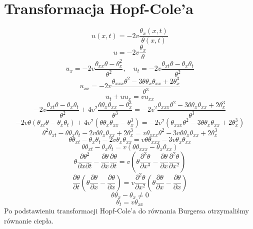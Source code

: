 \documentclass[a4paper,12pt]{article}
\begin{document}
\section{Transformacja Hopf-Cole'a}
$$u(x,t)=-2v\frac{\theta _x (x,t)}{\theta (x,t)}$$
$$u=-2v\frac{\theta _x}{\theta}$$
	$$u_x=-2v\frac{\theta _{xx} \theta - \theta ^{2}_{x}}{\theta ^2}, \quad u_t=-2v\frac{\theta _{xt}\theta - \theta _x \theta _t}{\theta ^2}$$
	$$u_{xx}=-2v\frac{\theta _{xxx}\theta ^2 - 3\theta \theta _x \theta _{xx} + 2\theta ^{3}_{x}}{\theta ^3}$$
	$$u_t + u u_x = v u_{xx}$$
$$-2v \frac{\theta _{xt}\theta - \theta _x \theta _t }{\theta ^2} + 4 v^2 \frac{\theta \theta _x \theta _{xx} - \theta ^{3}_{x}}{\theta ^3} = -2v^2\frac{\theta _{xxx} \theta ^2 - 3\theta \theta _x \theta _{xx} + 2\theta ^{3}_{x}}{\theta ^3}$$
$$-2v\theta (\theta _{xt} \theta - \theta _x \theta _t ) +4v^2 (\theta \theta _x \theta _{xx} - \theta ^{3}_{x}) = -2v^2(\theta _{xxx} \theta ^2 - 3\theta \theta _x \theta _{xx} + 2\theta ^{3}_{x})$$
$$\theta ^2 \theta _{xt} - \theta \theta _x \theta _t -2v \theta \theta _x \theta _{xx} +2\theta^{3}_{x}=v \theta _{xxx} \theta ^2 -3v\theta \theta _x \theta _{xx} +2 \theta ^{3}_{x}$$
$$\theta \theta _{xt} - \theta _x \theta _t -2v\theta _x \theta _{xx}= v\theta \theta _{xxx} - 3v\theta _x \theta _{xx}$$
$$\theta \theta _{xt} - \theta _x \theta _t = v(\theta \theta _{xxx} - \theta _x \theta _{xx})$$
$$\theta \frac{\partial 
\theta ^2}{\partial x \partial t}- \frac{\partial \theta}{\partial x} \frac{\partial \theta}{\partial t} = v(\theta \frac{\partial ^3 \theta}{\partial x^3}-\frac{\partial \theta}{\partial x}\frac{\partial ^2 \theta}{\partial x^2})$$
$$\frac{\partial \theta}{\partial t}(\theta \frac{\partial \theta}{\partial x}-\frac{\partial \theta}{\partial x})=v\frac{\partial ^2 \theta}{\partial x^2}(\theta \frac{\partial \theta}{\partial x}-\frac{\partial \theta}{\partial x})$$
$$\theta \theta _x - \theta _x \neq 0$$
$$ \theta _t = v \theta _{xx}$$
Po podstawieniu transformacji Hopf-Cole'a do równania Burgersa otrzymaliśmy równanie ciepła.
\end{document}
